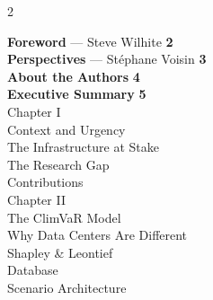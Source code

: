 
\begin{multicols}{2}

{\fontsize{9}{12}\selectfont

\noindent\textbf{\color{SEDarkGreen}Foreword} --- Steve Wilhite \dotfill \textbf{2}\\[2pt]
\noindent\textbf{\color{SEDarkGreen}Perspectives} --- St\'{e}phane Voisin \dotfill \textbf{3}\\[2pt]
\noindent\textbf{\color{SEDarkGreen}About the Authors} \dotfill \textbf{4}\\[2pt]
\noindent\textbf{\color{SEDarkGreen}Executive Summary} \dotfill \textbf{5}\\[14pt]
%
{\fontsize{12}{15}\selectfont\displayfont\color{SEGreen}Chapter I}\\[3pt]
\noindent\hspace{5mm}Context and Urgency \\[1pt]
\noindent\hspace{5mm}The Infrastructure at Stake \\[1pt]
\noindent\hspace{5mm}The Research Gap \\[1pt]
\noindent\hspace{5mm}Contributions \\[14pt]
%
{\fontsize{12}{15}\selectfont\displayfont\color{SEGreen}Chapter II}\\[3pt]
\noindent\hspace{5mm}The ClimVaR Model \\[1pt]
\noindent\hspace{5mm}Why Data Centers Are Different \\[1pt]
\noindent\hspace{5mm}Shapley \& Leontief \\[1pt]
\noindent\hspace{5mm}Database \\[1pt]
\noindent\hspace{5mm}Scenario Architecture \\[14pt]

}
\end{multicols}
